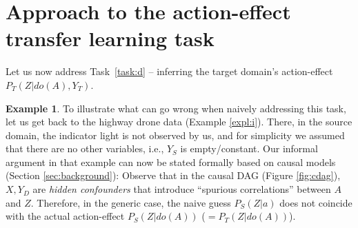 \documentclass[letterpaper]{article} %
\theoremstyle{definition}%
\theoremstyle{definition}
\newtheorem{example}{Example}
\newtheorem{goal}{Goal}
\newcommand{\dob}[1]{do(#1)}
\newcommand{\Obs}{Y}
\newcommand{\Out}{Z}
\newcommand{\dec}{action-effect transfer learning task\xspace}
\begin{document}







\section{Approach to the \dec}
\label{sec:dea}



Let us now address Task~\ref{task:d} -- inferring the target domain's action-effect $P_T(\Out|\dob{A}, Y_T)$.


\begin{example}
	To illustrate what can go wrong when naively addressing this task, let us get back to the highway drone data (Example \ref{expl:i}). There, in the source domain, the indicator light is not observed by us, and for simplicity we assumed that there are no other variables, i.e., $Y_S$ is empty/constant. Our informal argument in that example can now be stated formally based on causal models (Section \ref{sec:background}):
	Observe that in the causal DAG (Figure \ref{fig:cdag}), $X, Y_D$ are \emph{hidden confounders} that introduce ``spurious correlations'' between $A$ and $Z$. Therefore, in the generic case, the naive guess $P_S(\Out|a)$ does not coincide with the actual action-effect $P_S(\Out|\dob{A})$ ($= P_T(\Out|\dob{A})$).
\end{example}

\end{document}
